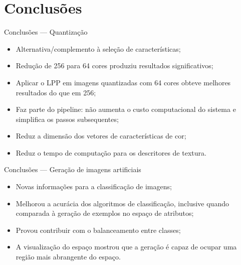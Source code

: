 \documentclass[10pt]{beamer}
\begin{document}
\section{Conclusões}
\begin{frame}{Conclusões --- Quantização}
  \setlength\leftmargini{1em}
  \begin{itemize}
    \item Alternativa/complemento à seleção de características;
    \item Redução de 256 para 64 cores produziu resultados significativos;
    \item Aplicar o LPP em imagens quantizadas com 64 cores obteve melhores resultados do que em 256;
    \item Faz parte do pipeline: não aumenta o custo computacional do sistema e simplifica os passos subsequentes;
    \item Reduz a dimensão dos vetores de características de cor;
    \item Reduz o tempo de computação para os descritores de textura.
  \end{itemize}
\end{frame}
\begin{frame}{Conclusões --- Geração de imagens artificiais}
  \setlength\leftmargini{1em}
  \begin{itemize}
    \item Novas informações para a classificação de imagens;
    \item Melhorou a acurácia dos algoritmos de classificação, inclusive quando comparada à geração de exemplos no espaço de atributos;
    \item Provou contribuir com o balanceamento entre classes;
    \item A visualização do espaço mostrou que a geração é capaz de ocupar uma região mais abrangente do espaço.
  \end{itemize}
\end{frame}
\end{document}

